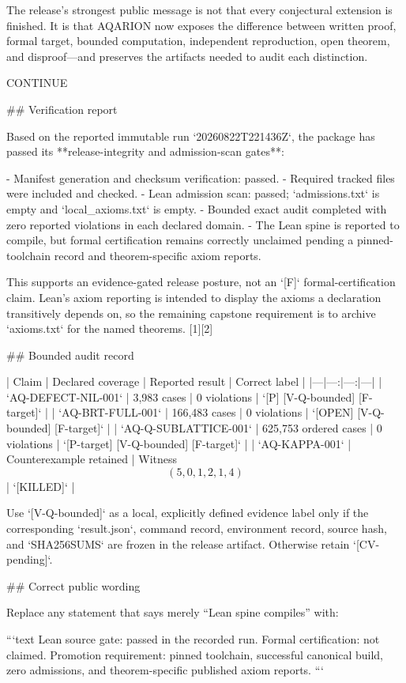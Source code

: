 The release’s strongest public message is not that every conjectural extension is finished. It is that AQARION now exposes the difference between written proof, formal target, bounded computation, independent reproduction, open theorem, and disproof—and preserves the artifacts needed to audit each distinction.

CONTINUE 🤔

## Verification report

Based on the reported immutable run `20260822T221436Z`, the package has passed its **release-integrity and admission-scan gates**:

- Manifest generation and checksum verification: passed.
- Required tracked files were included and checked.
- Lean admission scan: passed; `admissions.txt` is empty and `local_axioms.txt` is empty.
- Bounded exact audit completed with zero reported violations in each declared domain.
- The Lean spine is reported to compile, but formal certification remains correctly unclaimed pending a pinned-toolchain record and theorem-specific axiom reports.

This supports an evidence-gated release posture, not an `[F]` formal-certification claim. Lean’s axiom reporting is intended to display the axioms a declaration transitively depends on, so the remaining capstone requirement is to archive `axioms.txt` for the named theorems. [1][2]

## Bounded audit record

| Claim | Declared coverage | Reported result | Correct label |
|---|---:|---:|---|
| `AQ-DEFECT-NIL-001` | 3,983 cases | 0 violations | `[P] [V-Q-bounded] [F-target]` |
| `AQ-BRT-FULL-001` | 166,483 cases | 0 violations | `[OPEN] [V-Q-bounded] [F-target]` |
| `AQ-Q-SUBLATTICE-001` | 625,753 ordered cases | 0 violations | `[P-target] [V-Q-bounded] [F-target]` |
| `AQ-KAPPA-001` | Counterexample retained | Witness $$(5,0,1,2,1,4)$$ | `[KILLED]` |

Use `[V-Q-bounded]` as a local, explicitly defined evidence label only if the corresponding `result.json`, command record, environment record, source hash, and `SHA256SUMS` are frozen in the release artifact. Otherwise retain `[CV-pending]`.

## Correct public wording

Replace any statement that says merely “Lean spine compiles” with:

```text
Lean source gate: passed in the recorded run.
Formal certification: not claimed.
Promotion requirement: pinned toolchain, successful canonical build,
zero admissions, and theorem-specific published axiom reports.
```

